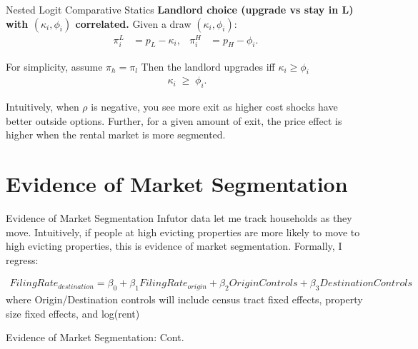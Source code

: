 \documentclass[10pt, xcolor=dvipsnames]{beamer}
\begin{document}
\begin{frame}{Nested Logit Comparative Statics}
    \textbf{Landlord choice (upgrade vs stay in L) with $(\kappa_i,\phi_i)$ correlated.}
Given a draw $(\kappa_i,\phi_i)$:
\begin{align*}
\pi_i^{L} &= p_L - \kappa_i, 
&
\pi_i^{H} &= p_H-\phi_i.
\end{align*}

For simplicity, assume $\pi_h = \pi_l$
Then the landlord upgrades iff $\kappa_i \geq \phi_i$
\begin{align*}
\boxed{\;\kappa_i  \;\ge\; \phi_i }.
\end{align*}

Intuitively, when $\rho$ is negative, you see more exit as higher cost shocks have better outside options. Further, for a given amount of exit, the price effect is higher when the rental market is more segmented.

\end{frame}

\section{Evidence of Market Segmentation}

\begin{frame}{Evidence of Market Segmentation}
    Infutor data let me track households as they move. Intuitively, if people at high evicting properties are more likely to move to high evicting properties, this is evidence of market segmentation. Formally, I regress:

    \begin{align*}
        FilingRate_{destination} = \beta_0 +\beta_1FilingRate_{origin} + \beta_2OriginControls + \beta_3DestinationControls 
    \end{align*}
    where Origin/Destination controls will include census tract fixed effects, property size fixed effects, and log(rent)
\end{frame}

\begin{frame}{Evidence of Market Segmentation: Cont.}
    \tiny
    
\end{frame}
\end{document}
